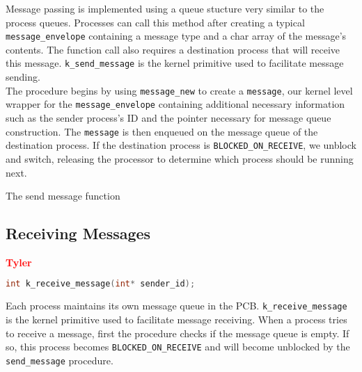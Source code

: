 \documentclass[12pt]{report}
\begin{document}
Message passing is implemented using a queue stucture very similar to the process queues. Processes can call this method after creating a typical {\tt message_envelope} containing a message type and a char array of the message's contents. The function call also requires a destination process that will receive this message. {\tt k\_send\_message} is the kernel primitive used to facilitate message sending.\\

The procedure begins by using {\tt message\_new} to create a {\tt message}, our kernel level wrapper for the {\tt message_envelope} containing additional necessary information such as the sender process's ID and the pointer necessary for message queue construction. The {\tt message} is then enqueued on the message queue of the destination process. If the destination process is {\tt BLOCKED\_ON\_RECEIVE}, we unblock and switch, releasing the processor to determine which process should be running next. \\

\begin{algorithm}
  \caption{The send message function}
  \begin{algorithmic}[1]
      
		\EndIf
    \EndProcedure
  \end{algorithmic}
\end{algorithm}

\subsection{Receiving Messages}

\textcolor{red}{\textbf{Tyler}} \\
\begin{minipage}{\textwidth}
\begin{lstlisting}[language=C, frame=single]
int k_receive_message(int* sender_id);
\end{lstlisting}
\end{minipage}

Each process maintains its own message queue in the PCB. {\tt k\_receive\_message} is the kernel primitive used to facilitate message receiving. When a process tries to receive a message, first the procedure checks if the message queue is empty. If so, this process becomes {\tt BLOCKED\_ON\_RECEIVE} and will become unblocked by the {\tt send\_message} procedure. \\
\end{document}
